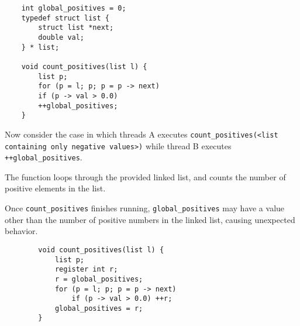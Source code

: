 \documentclass[12pt,largemargins]{homework}
\newcommand{\code}{\texttt}
\begin{document}
\maketitle


\begin{verbatim}
    int global_positives = 0;
    typedef struct list {
        struct list *next;
        double val;
    } * list;

    void count_positives(list l) {
        list p;
        for (p = l; p; p = p -> next)
        if (p -> val > 0.0)
        ++global_positives;
    }
    \end{verbatim}

Now consider the case in which threads A executes
\code{count\_positives(<list containing only negative values>)}
while thread B executes \newline \code{++global\_positives}.

\begin{alphaparts}

    The function loops through the provided linked list, and counts the
    number of positive elements in the list.


    Once \code{count\_positives} finishes running, \code{global\_positives} may
    have a value other than the number of positive numbers in the linked list,
    causing unexpected behavior.
\end{alphaparts}

\clearpage
{}

\begin{verbatim}
        void count_positives(list l) { 
            list p; 
            register int r; 
            r = global_positives; 
            for (p = l; p; p = p -> next) 
                if (p -> val > 0.0) ++r; 
            global_positives = r; 
        }
    \end{verbatim}
\end{document}
